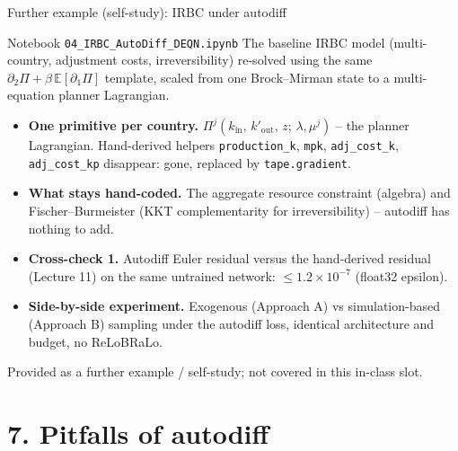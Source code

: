 \documentclass[aspectratio=169,11pt]{beamer}
\newcommand{\emphc}[1]{\textcolor{harvardcrimson}{#1}}
\begin{document}
\begin{frame}[fragile]{Further example (self-study): IRBC under autodiff}
\footnotesize
\begin{block}{Notebook \texttt{04\_IRBC\_AutoDiff\_DEQN.ipynb}}
The baseline IRBC model (multi-country, adjustment costs, irreversibility) re-solved using the same $\partial_2\Pi + \beta\,\mathbb{E}[\partial_1\Pi]$ template, scaled from one Brock--Mirman state to a multi-equation planner Lagrangian.
\end{block}
\vspace{2pt}
\begin{itemize}\itemsep2pt
\item \textbf{One primitive per country.} \(\Pi^j(k_{\text{in}},\,k'_{\text{out}},\,z;\,\lambda,\mu^j)\) -- the planner Lagrangian. Hand-derived helpers \texttt{production\_k}, \texttt{mpk}, \texttt{adj\_cost\_k}, \texttt{adj\_cost\_kp} disappear: gone, replaced by \texttt{tape.gradient}.
\item \textbf{What stays hand-coded.} The aggregate resource constraint (algebra) and Fischer--Burmeister (KKT complementarity for irreversibility) -- autodiff has nothing to add.
\item \textbf{Cross-check 1.} Autodiff Euler residual versus the hand-derived residual (Lecture 11) on the same untrained network: \emphc{$\le 1.2\times 10^{-7}$} (float32 epsilon).
\item \textbf{Side-by-side experiment.} Exogenous (Approach A) vs simulation-based (Approach B) sampling under the autodiff loss, identical architecture and budget, no ReLoBRaLo.
\end{itemize}
\vspace{2pt}
\centerline{\emphc{Provided as a further example / self-study; not covered in this in-class slot.}}
\end{frame}


\section*{7. Pitfalls of autodiff}
\end{document}

